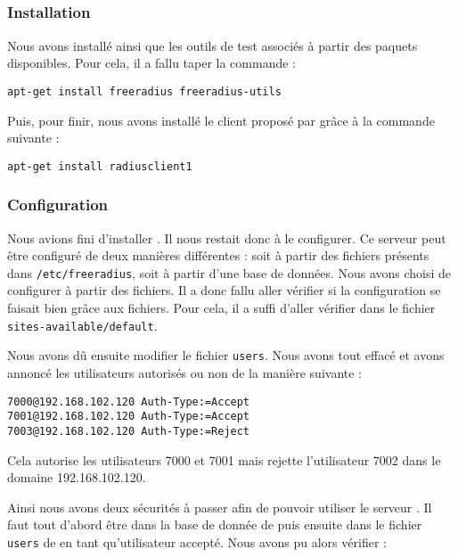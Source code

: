 \subsection{\frad}
\subsubsection{Installation}

Nous avons installé {\frad} ainsi que les outils de test associés à partir des paquets disponibles. Pour cela, il a fallu taper la commande :

\begin{verbatim}
apt-get install freeradius freeradius-utils
\end{verbatim}

Puis, pour finir, nous avons installé le client {\rad} proposé par {\frad} grâce à la commande suivante :

\begin{verbatim}
apt-get install radiusclient1
\end{verbatim}

\subsubsection{Configuration}
Nous avions fini d'installer {\frad}. Il nous restait donc à le configurer. Ce serveur {\rad} peut être configuré de deux manières différentes : soit à partir des fichiers présents dans \texttt{/etc/freeradius}, soit à partir d'une base de données. Nous avons choisi de configurer à partir des fichiers. Il a donc fallu aller vérifier si la configuration se faisait bien grâce aux fichiers. Pour cela, il a suffi d'aller vérifier dans le fichier \texttt{sites-available/default}.


Nous avons dû ensuite modifier le fichier \texttt{users}. Nous avons tout effacé et avons annoncé les utilisateurs autorisés ou non de la manière suivante :

\begin{verbatim}
7000@192.168.102.120 Auth-Type:=Accept
7001@192.168.102.120 Auth-Type:=Accept
7003@192.168.102.120 Auth-Type:=Reject
\end{verbatim}

Cela autorise les utilisateurs 7000 et 7001 mais rejette l'utilisateur 7002 dans le domaine 192.168.102.120.

\newpage

Ainsi nous avons deux sécurités à passer afin de pouvoir utiliser le serveur {\kam}. Il faut tout d'abord être dans la base de donnée de {\kam} puis ensuite dans le fichier \texttt{users} de {\frad} en tant qu'utilisateur accepté. Nous avons pu alors vérifier :


